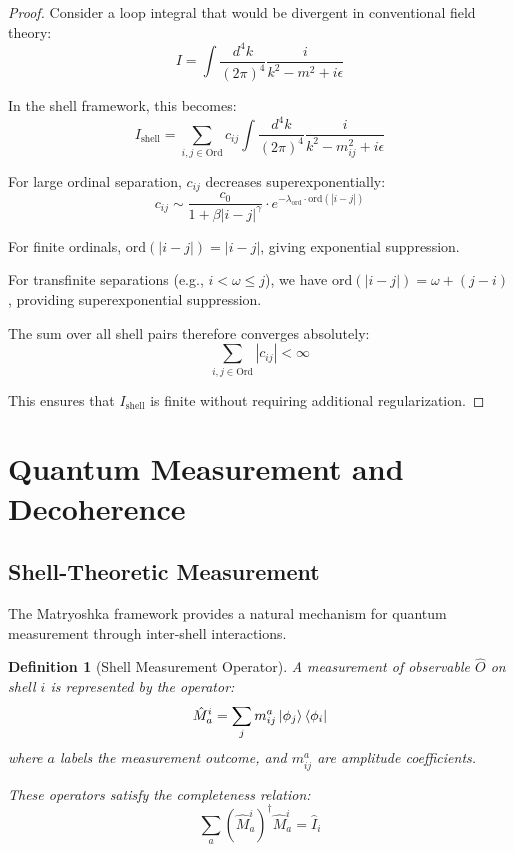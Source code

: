 \documentclass[12pt,a4paper]{article}
\newtheorem{definition}{Definition}[section]
\newcommand{\ord}{\text{ord}}
\begin{document}
\begin{proof}
Consider a loop integral that would be divergent in conventional field theory:
\begin{equation}
I = \int \frac{d^4k}{(2\pi)^4} \frac{i}{k^2 - m^2 + i\epsilon}
\end{equation}

In the shell framework, this becomes:
\begin{equation}
I_{\text{shell}} = \sum_{i,j \in \text{Ord}} c_{ij} \int \frac{d^4k}{(2\pi)^4} \frac{i}{k^2 - m_{ij}^2 + i\epsilon}
\end{equation}

For large ordinal separation, $c_{ij}$ decreases superexponentially:
\begin{equation}
c_{ij} \sim \frac{c_0}{1 + \beta |i-j|^\gamma} \cdot e^{-\lambda_{\ord} \cdot \ord(|i-j|)}
\end{equation}

For finite ordinals, $\ord(|i-j|) = |i-j|$, giving exponential suppression.

For transfinite separations (e.g., $i < \omega \leq j$), we have $\ord(|i-j|) = \omega + (j-i)$, providing superexponential suppression.

The sum over all shell pairs therefore converges absolutely:
\begin{equation}
\sum_{i,j \in \text{Ord}} |c_{ij}| < \infty
\end{equation}

This ensures that $I_{\text{shell}}$ is finite without requiring additional regularization.
\end{proof}

\section{Quantum Measurement and Decoherence}
\label{sec:measurement-decoherence}

\subsection{Shell-Theoretic Measurement}
\label{subsec:shell-measurement}

The Matryoshka framework provides a natural mechanism for quantum measurement through inter-shell interactions.

\begin{definition}[Shell Measurement Operator]
\label{def:measurement-operator}
A measurement of observable $\hat{O}$ on shell $i$ is represented by the operator:
\begin{equation}
\hat{M}_a^i = \sum_j m_{ij}^a \ket{\phi_j}\bra{\phi_i}
\end{equation}
where $a$ labels the measurement outcome, and $m_{ij}^a$ are amplitude coefficients.

These operators satisfy the completeness relation:
\begin{equation}
\sum_a (\hat{M}_a^i)^\dagger \hat{M}_a^i = \hat{I}_i
\end{equation}
\end{definition}
\end{document}
